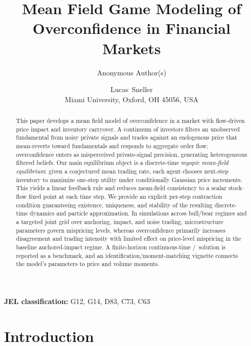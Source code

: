 \title{Mean Field Game Modeling of Overconfidence in Financial Markets}
\ifjeicblind
  \author{Anonymous Author(s)}
\else
  \author{Lucas~Sneller\\[0.5em]\normalsize Miami University, Oxford, OH 45056, USA}
\fi
\date{}


\maketitle
\thispagestyle{empty}

\begin{abstract}
This paper develops a mean field model of overconfidence in a market with flow-driven price impact and inventory carryover. A continuum of investors filters an unobserved fundamental from noisy private signals and trades against an endogenous price that mean-reverts toward fundamentals and responds to aggregate order flow; overconfidence enters as misperceived private-signal precision, generating heterogeneous filtered beliefs. Our main equilibrium object is a discrete-time \emph{myopic mean-field equilibrium}: given a conjectured mean trading rate, each agent chooses next-step inventory to maximize one-step \CARA utility under conditionally Gaussian price increments. This yields a linear feedback rule and reduces mean-field consistency to a scalar stock--flow fixed point at each time step. We provide an explicit per-step contraction condition guaranteeing existence, uniqueness, and stability of the resulting discrete-time dynamics and particle approximation. In simulations across bull/bear regimes and a targeted joint grid over anchoring, impact, and noise trading, microstructure parameters govern mispricing levels, whereas overconfidence primarily increases disagreement and trading intensity with limited effect on price-level mispricing in the baseline anchored-impact regime. A finite-horizon continuous-time \CARA/\LQG\ solution is reported as a benchmark, and an identification/moment-matching vignette connects the model's parameters to price and volume moments.
\end{abstract}


\noindent\textbf{JEL classification:} G12, G14, D83, C73, C63

\section{Introduction}
\label{sec:introduction}


